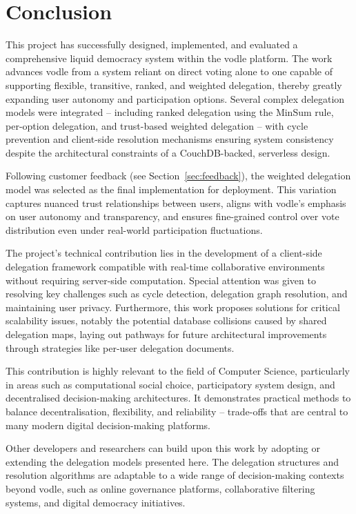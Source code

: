 \chapter{Conclusion}\label{ch:conclusions}

This project has successfully designed, implemented, and evaluated a comprehensive liquid democracy system within the vodle platform. The work advances vodle from a system reliant on direct voting alone to one capable of supporting flexible, transitive, ranked, and weighted delegation, thereby greatly expanding user autonomy and participation options. Several complex delegation models were integrated -- including ranked delegation using the MinSum rule, per-option delegation, and trust-based weighted delegation -- with cycle prevention and client-side resolution mechanisms ensuring system consistency despite the architectural constraints of a CouchDB-backed, serverless design.

Following customer feedback (see Section~\ref{sec:feedback}), the weighted delegation model was selected as the final implementation for deployment. This variation captures nuanced trust relationships between users, aligns with vodle's emphasis on user autonomy and transparency, and ensures fine-grained control over vote distribution even under real-world participation fluctuations.

The project's technical contribution lies in the development of a client-side delegation framework compatible with real-time collaborative environments without requiring server-side computation. Special attention was given to resolving key challenges such as cycle detection, delegation graph resolution, and maintaining user privacy. Furthermore, this work proposes solutions for critical scalability issues, notably the potential database collisions caused by shared delegation maps, laying out pathways for future architectural improvements through strategies like per-user delegation documents.

This contribution is highly relevant to the field of Computer Science, particularly in areas such as computational social choice, participatory system design, and decentralised decision-making architectures. It demonstrates practical methods to balance decentralisation, flexibility, and reliability -- trade-offs that are central to many modern digital decision-making platforms.

Other developers and researchers can build upon this work by adopting or extending the delegation models presented here. The delegation structures and resolution algorithms are adaptable to a wide range of decision-making contexts beyond vodle, such as online governance platforms, collaborative filtering systems, and digital democracy initiatives.

